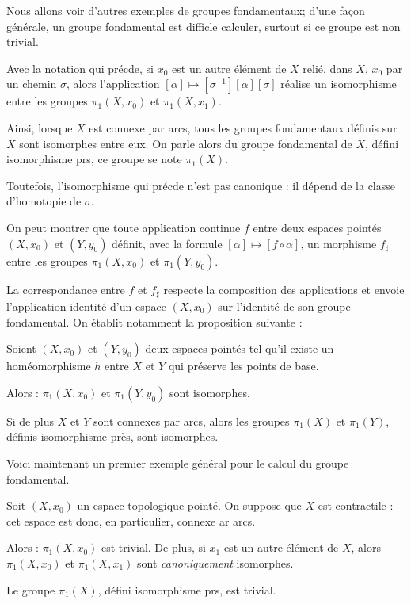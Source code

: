 Nous allons voir d'autres exemples de groupes fondamentaux; d'une fa\c con g\'en\'erale, un groupe fondamental est difficle  calculer, surtout si ce groupe est non trivial.

Avec la notation qui pr\'ecde, si $x_0$ est un autre \'el\'ement de $X$ reli\'e, dans $X$,  $x_0$ par un chemin $\sigma$, %
alors l'application $[\alpha]\mapsto [\sigma^{-1}][\alpha][\sigma]$ r\'ealise un isomorphisme entre les groupes $\pi_1(X,x_0)$ et $\pi_1(X,x_1)$.

\par
Ainsi, lorsque $X$ est connexe par arcs, tous les groupes fondamentaux d\'efinis sur $X$ sont isomorphes entre eux. %
On parle alors du groupe fondamental de $X$, d\'efini  isomorphisme prs, ce groupe se note $\pi_1(X)$.

\par
Toutefois, l'isomorphisme qui pr\'ecde n'est pas canonique : il d\'epend de la classe d'homotopie de $\sigma$.

\etoile
On peut montrer que toute application continue $f$ entre deux espaces point\'es $(X,x_0)$ et $(Y,y_0)$ d\'efinit, %
avec la formule $[\alpha]\mapsto [f\circ\alpha]$, un morphisme $f_{\sharp}$ entre les groupes $\pi_1 (X,x_0)$ et $\pi_1 (Y,y_0)$.

\par
La correspondance entre $f$ et $f_{\sharp}$ respecte la composition des applications et envoie l'application identit\'e d'un espace $(X,x_0)$ sur l'identit\'e de son groupe fondamental. %
On \'etablit notamment la proposition suivante :

\begin{prop}
Soient $(X,x_0)$ et $(Y,y_0)$ deux espaces point\'es tel qu'il existe un hom\'eomorphisme $h$ entre $X$ et $Y$ qui pr\'eserve les points de base.

\par
Alors : $\pi_1(X,x_0)$ et $\pi_1(Y,y_0)$ sont isomorphes.

\par
Si de plus $X$ et $Y$ sont connexes par arcs, alors les groupes $\pi_1 (X)$ et $\pi_1 (Y)$, d\'efinis  isomorphisme pr\`es, sont isomorphes.
\end{prop}

\etoile
Voici maintenant un premier exemple g\'en\'eral pour le calcul du groupe fondamental.

\begin{theo}
Soit $(X,x_0)$ un espace topologique point\'e. On suppose que $X$ est contractile : cet espace est donc, en particulier, connexe ar arcs.

\par
Alors : $\pi_1(X,x_0)$ est trivial. De plus, si $x_1$ est un autre \'el\'ement de $X$, alors $\pi_1(X,x_0)$ et $\pi_1(X,x_1)$ sont \textit{canoniquement} isomorphes.

\par
Le groupe $\pi_1(X)$, d\'efini  isomorphisme prs, est trivial.
\end{theo}

